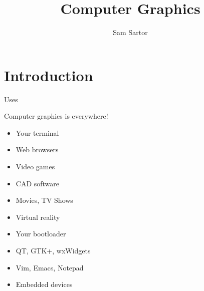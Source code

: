 \documentclass{lug}
\title{Computer Graphics}
\author{Sam Sartor}
\institute{Mines Linux Users Group}
\newcommand{\splitslide}[4]{
    \noindent
    \begin{minipage}{#1 \textwidth - #2 }
        #3
    \end{minipage}%
    \hspace{ \dimexpr #2 * 2 \relax }%
    \begin{minipage}{\textwidth - #1 \textwidth - #2 }
        #4
    \end{minipage}
}
\begin{document}
\section{Introduction}

\begin{frame}{Uses}
    \splitslide{0.65}{.7em}{
        Computer graphics is everywhere!
        \begin{itemize}
            \item Your terminal
            \item Web browsers
            \item Video games
            \item CAD software
            \item Movies, TV Shows
            \item Virtual reality
            \item Your bootloader
            \item QT, GTK+, wxWidgets
            \item Vim, Emacs, Notepad
            \item Embedded devices
        \end{itemize}
    }{
}
\end{frame}
\end{document}
